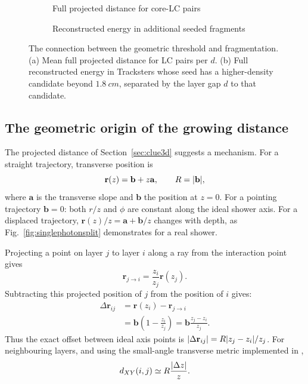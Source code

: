 \begin{figure}[!tp]
  \centering
  \begin{subfigure}[t]{0.49\textwidth}
    \caption{Full projected distance for core-LC pairs}
    \label{fig:singlephoton-pair-distance}
  \end{subfigure}\hfill
  \begin{subfigure}[t]{0.49\textwidth}
    \caption{Reconstructed energy in additional seeded fragments}
    \label{fig:singlephoton-seed-energy}
  \end{subfigure}
  \caption{The connection between the geometric threshold and fragmentation.
  (a) Mean full projected distance for LC pairs per $d$. (b) Full reconstructed energy in Tracksters whose
  seed has a higher-density candidate beyond $\SI{1.8}{cm}$, separated by the layer gap $d$ to
  that candidate.}
  \label{fig:singlephotongaps}
\end{figure}

\subsection{The geometric origin of the growing distance}

The projected distance of Section~\ref{sec:clue3d} suggests a mechanism.
For a straight trajectory, transverse position is
\begin{equation}
  \mathbf{r}(z)=\mathbf{b}+z\mathbf{a},
  \qquad R=|\mathbf{b}|,
  \label{eq:displacedline}
\end{equation}
where $\mathbf{a}$ is the transverse slope and $\mathbf{b}$ the position at
$z=0$. For a pointing trajectory $\mathbf{b}=0$: both $r/z$ and $\phi$ are
constant along the ideal shower axis. For a displaced trajectory,
$\mathbf{r}(z)/z=\mathbf{a}+\mathbf{b}/z$ changes with depth, as
Fig.~\ref{fig:singlephotonsplit} demonstrates for a real shower.

Projecting a point on layer $j$ to layer $i$ along a ray from the interaction
point gives
\begin{equation}
  \mathbf{r}_{j\to i}
    =\frac{z_i}{z_j}\mathbf{r}(z_j).
\end{equation}
Subtracting this projected position of $j$ from the position of $i$ gives:
\begin{align}
  \Delta\mathbf{r}_{ij}
    &=\mathbf{r}(z_i)-\mathbf{r}_{j\to i}\\
    &=\mathbf{b}\left(1-\frac{z_i}{z_j}\right)
     =\mathbf{b}\frac{z_j-z_i}{z_j}.
  \label{eq:projectionerror}
\end{align}
Thus the exact offset between ideal axis points is
$|\Delta\mathbf{r}_{ij}|=R|z_j-z_i|/z_j$. For neighbouring layers, and
using the small-angle transverse metric implemented in \cluethreed{},
\begin{equation}
  d_{XY}(i,j)\simeq R\frac{|\Delta z|}{z}.
  \label{eq:displacedscale}
\end{equation}

